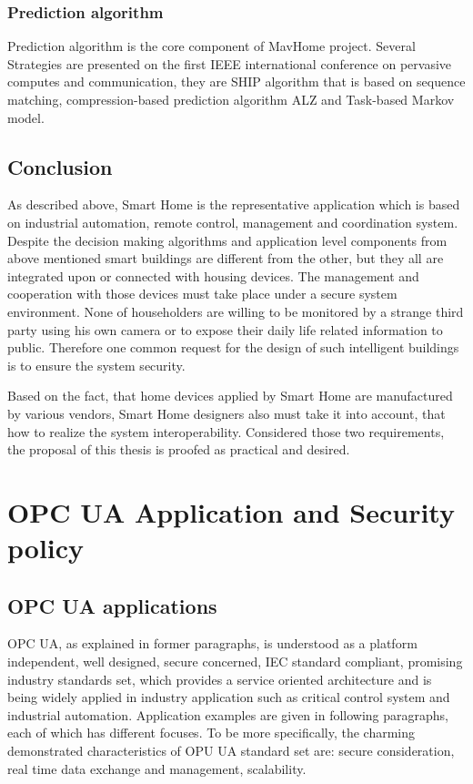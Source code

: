 \subsubsection{Prediction algorithm}
Prediction algorithm is the core component of MavHome project. Several Strategies are presented on the first IEEE international conference on pervasive computes and communication, they are SHIP algorithm that is based on sequence matching, compression-based prediction algorithm ALZ and Task-based Markov model\cite{smart_home_agent}.

\subsection{Conclusion}
As described above, Smart Home is the representative application which is based on industrial automation, remote control, management and coordination system. Despite the decision making algorithms and application level components from above mentioned smart buildings are different from the other, but they all are integrated upon or connected with housing devices. The management and cooperation with those devices must take place under a secure system environment. None of householders are willing to be monitored by a strange third party using his own camera or to expose their daily life related information to public. Therefore one common request for the design of such intelligent buildings is to ensure the system security.

Based on the fact, that home devices applied by Smart Home are manufactured by various vendors,  Smart Home designers also must take it into account, that how to realize the system interoperability. Considered those two requirements, the proposal of this thesis is proofed as practical and desired.

\section{OPC UA Application and Security policy }

\subsection{OPC UA applications}
OPC UA, as explained in former paragraphs,  is understood as a platform independent, well designed, secure concerned, IEC standard compliant, promising industry standards set, which provides a service oriented architecture and is being widely applied in industry application such as critical control system and industrial automation. Application examples are given in following paragraphs, each of which has different focuses. To be more specifically, the charming demonstrated characteristics of OPU UA standard set are: secure consideration, real time data exchange and management, scalability. 

